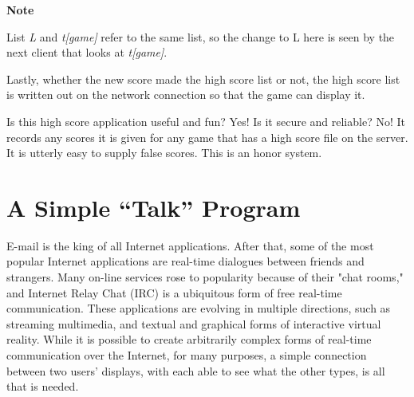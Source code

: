 
{\sffamily\bfseries
Note}

{\sffamily
List \textit{L} and \textit{t[game]} refer to the same list, so the
change to L here is seen by the next client that looks at
\textit{t[game]}.}

Lastly, whether the new score made the high score list or not, the high
score list is written out on the network connection so that the game
can display it.


Is this high score application useful and fun? Yes! Is it secure and
reliable? No! It records any scores it is given for any game that has a
high score file on the server. It is utterly easy to supply false
scores. This is an honor system.

\section{A Simple ``Talk'' Program}

E-mail is the king of all Internet applications. After that, some of the
most popular Internet applications are real-time dialogues between
friends and strangers. Many on-line services rose to popularity because
of their "chat rooms," and Internet Relay
Chat (IRC) is a ubiquitous form of free real-time
communication. These applications are evolving in multiple directions,
such as streaming multimedia, and textual and graphical forms of
interactive virtual reality. While it is possible to create arbitrarily
complex forms of real-time communication over the Internet, for many
purposes, a simple connection between two users'
displays, with each able to see what the other types, is all that is
needed.

